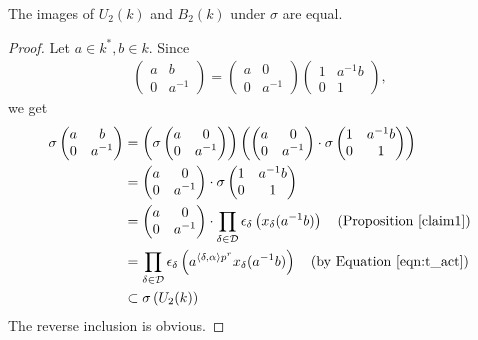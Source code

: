 \begin{proposition}\label{imb:imu}
The images of $U_2(k)$ and $B_2(k)$ under $\sigma$ are equal.
\end{proposition}
\begin{proof}
	Let $a\in k^*, b\in k$. Since
\begin{align*}
	\left(\begin{matrix}a & b\\0 & a^{-1}\end{matrix}\right) = 
	\left(\begin{matrix}a & 0\\0 & a^{-1}\end{matrix}\right)
	\left(\begin{matrix}1 & a^{-1}b\\0 & 1\end{matrix}\right),
\end{align*}
we get
\begin{align*}
	\sigma\left(\begin{matrix}a & b\\0 & a^{-1}\end{matrix}\right) &=
	\left(\sigma\left(\begin{matrix}a & 0\\0 & a^{-1}\end{matrix}\right)\right)
	\left(
	\left(\begin{matrix}a & 0\\0 & a^{-1}\end{matrix}\right) \cdot
	\sigma\left(\begin{matrix}1 & a^{-1}b\\0 & 1\end{matrix}\right)
	\right)\\
	&= \left(\begin{matrix}a & 0\\0 & a^{-1}\end{matrix}\right) \cdot
	\sigma\left(\begin{matrix}1 & a^{-1}b\\0 & 1\end{matrix}\right) \\
	&= \left(\begin{matrix}a & 0\\0 & a^{-1}\end{matrix}\right) \cdot
	\prod_{\delta\in\mathcal{D}} \epsilon_\delta\left(x_\delta(a^{-1}b)\right)\quad(\textrm{Proposition \ref{claim1}}) \\
	&= 
	\prod_{\delta\in\mathcal{D}} \epsilon_\delta\left(a^{\langle\delta, \alpha\rangle p^r}x_\delta(a^{-1}b)\right)\quad(\textrm{by Equation \ref{eqn:t_act}})\\
	&\subset \sigma\left(U_2(k)\right)
\end{align*}
The reverse inclusion is obvious.
\end{proof}

